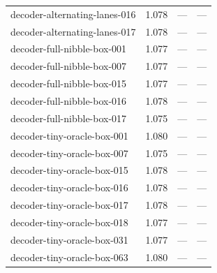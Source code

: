 {\begin{longtable}{lrrr}
decoder-alternating-lanes-016 & 1.078 & --- & --- \\
decoder-alternating-lanes-017 & 1.078 & --- & --- \\
decoder-full-nibble-box-001 & 1.077 & --- & --- \\
decoder-full-nibble-box-007 & 1.077 & --- & --- \\
decoder-full-nibble-box-015 & 1.077 & --- & --- \\
decoder-full-nibble-box-016 & 1.078 & --- & --- \\
decoder-full-nibble-box-017 & 1.075 & --- & --- \\
decoder-tiny-oracle-box-001 & 1.080 & --- & --- \\
decoder-tiny-oracle-box-007 & 1.075 & --- & --- \\
decoder-tiny-oracle-box-015 & 1.078 & --- & --- \\
decoder-tiny-oracle-box-016 & 1.078 & --- & --- \\
decoder-tiny-oracle-box-017 & 1.078 & --- & --- \\
decoder-tiny-oracle-box-018 & 1.077 & --- & --- \\
decoder-tiny-oracle-box-031 & 1.077 & --- & --- \\
decoder-tiny-oracle-box-063 & 1.080 & --- & --- \\
\bottomrule\end{longtable}}
